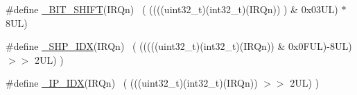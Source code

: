 \begin{DoxyCompactItemize}
\#define \hyperlink{group___c_m_s_i_s___core___n_v_i_c_functions_gaba07722ca082d58bec5d76ca810098b3}{\+\_\+\+B\+I\+T\+\_\+\+S\+H\+I\+FT}(I\+R\+Qn)              ~(  ((((uint32\+\_\+t)(int32\+\_\+t)(I\+R\+Qn))         )      \&  0x03\+U\+L) $\ast$ 8\+U\+L)
\item 
\#define \hyperlink{group___c_m_s_i_s___core___n_v_i_c_functions_gaff3c15c4aebdc4792ad7d7353ce83566}{\+\_\+\+S\+H\+P\+\_\+\+I\+DX}(I\+R\+Qn)                  ~( (((((uint32\+\_\+t)(int32\+\_\+t)(I\+R\+Qn)) \& 0x0\+F\+U\+L)-\/8\+U\+L) $>$$>$    2\+U\+L)      )
\item 
\#define \hyperlink{group___c_m_s_i_s___core___n_v_i_c_functions_gad2ce0bc91da29afae2feebad3a7cc014}{\+\_\+\+I\+P\+\_\+\+I\+DX}(I\+R\+Qn)                    ~(   (((uint32\+\_\+t)(int32\+\_\+t)(I\+R\+Qn))                $>$$>$    2\+U\+L)      )
\end{DoxyCompactItemize}
